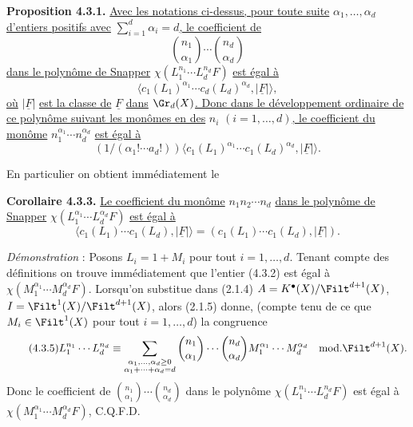 
\textbf{Proposition 4.3.1.} \uline{Avec les notations ci-dessus, pour toute suite} \(\alpha_1,\ldots,\alpha_d\) \uline{d'entiers positifs avec} \(\sum_{i=1}^{d}\alpha_i=d\)\uline{, le coefficient de}
\[
 \binom{n_1}{\alpha_1}\cdots\binom{n_d}{\alpha_d}
\]
\uline{dans le polynôme de Snapper} \(\chi(L_1^{n_1}\cdots L_d^{n_d}F)\) \uline{est égal à}
\begin{equation}\tag{4.3.2}
 \bigl\langle c_1(L_1)^{\alpha_1}\cdots c_d(L_d)^{\alpha_d},\lvert\underline{F}\rvert\bigr\rangle,
\end{equation}
\uline{où} \(\lvert\underline{F}\rvert\) \uline{est la classe de} \(\underline{F}\) \uline{dans} \(\Gr_d(X)\)\uline{. Donc dans le développement ordinaire de ce polynôme suivant les monômes en des} \(n_i\) \((i=1,\ldots,d)\)\uline{, le coefficient du monôme} \(n_1^{\alpha_1}\cdots n_d^{\alpha_d}\) \uline{est égal à}
\[
 (1/(\alpha_1! \cdots a_d!))
 \bigl\langle c_1(L_1)^{\alpha_1}\cdots c_1(L_d)^{\alpha_d},\lvert\underline{F}\rvert\bigr\rangle.
\]

En particulier on obtient immédiatement le

\textbf{Corollaire 4.3.3.} \uline{Le coefficient du monôme} \(n_1n_2\cdots n_d\) \uline{dans le polynôme de Snapper} \(\chi(L_1^{\alpha_1}\cdots L_d^{\alpha_d}F)\) \uline{est égal à}
\begin{equation}\tag{4.3.4}
 \bigl\langle c_1(L_1)\cdots c_1(L_d),\lvert\underline{F}\rvert\bigr\rangle
 =
 (c_1(L_1)\cdots c_1(L_d),\lvert\underline{F}\rvert).
\end{equation}

\emph{Démonstration} : Posons \(L_i=1+M_i\) pour tout \(i=1,\ldots,d\). Tenant compte des définitions on trouve immédiatement que l'entier (4.3.2) est égal à \(\chi(M_1^{\alpha_1}\cdots M_d^{\alpha_d}F)\). Lorsqu'on substitue dans (2.1.4) \(A=K^{\bullet}(X)/\Filt^{d+1}(X)\), \(I=\Filt^1(X)/\Filt^{d+1}(X)\), alors (2.1.5) donne, (compte tenu de ce que \(M_i\in\Filt^1(X)\) pour tout \(i=1,\ldots,d\)) la congruence
\begin{equation}\tag{4.3.5}
 L_1^{n_1}\cdots L_d^{n_d}
 \equiv
 \sum_{\substack{\alpha_1,\ldots,\alpha_d\geq0\\ \alpha_1+\cdots+\alpha_d=d}}
 \binom{n_1}{\alpha_1}\cdots\binom{n_d}{\alpha_d}
 M_1^{\alpha_1}\cdots M_d^{\alpha_d}
 \quad\mathrm{mod.}\Filt^{d+1}(X).
\end{equation}
Donc le coefficient de \(\binom{n_1}{\alpha_1}\cdots\binom{n_d}{\alpha_d}\) dans le polynôme \(\chi(L_1^{n_1}\cdots L_d^{n_d}F)\) est égal à \(\chi(M_1^{\alpha_1}\cdots M_d^{\alpha_d}F)\), C.Q.F.D.

